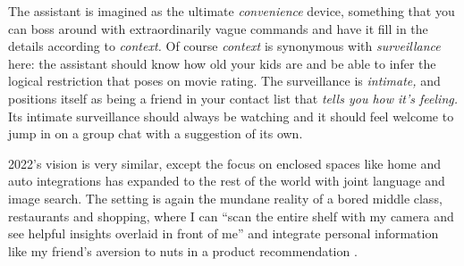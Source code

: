 \documentclass{article}
\begin{document}
The assistant is imagined as the ultimate \emph{convenience} device,
something that you can boss around with extraordinarily vague commands
and have it fill in the details according to \emph{context.} Of course
\emph{context} is synonymous with \emph{surveillance} here: the
assistant should know how old your kids are and be able to infer the
logical restriction that poses on movie rating. The surveillance is
\emph{intimate,} and positions itself as being a friend in your
contact list that \emph{tells you how it's feeling.} Its intimate
surveillance should always be watching and it should feel welcome to
jump in on a group chat with a suggestion of its own.

2022's vision is very similar, except the focus on enclosed spaces like
home and auto integrations has expanded to the rest of the world with
joint language and image search. The setting is again the mundane
reality of a bored middle class, restaurants and shopping, where I can
``scan the entire shelf with my camera and see helpful insights overlaid
in front of me'' and integrate personal
information like my friend's aversion to nuts in a product
recommendation \cite{googleGoogleKeynoteGoogle2022} .
\end{document}
